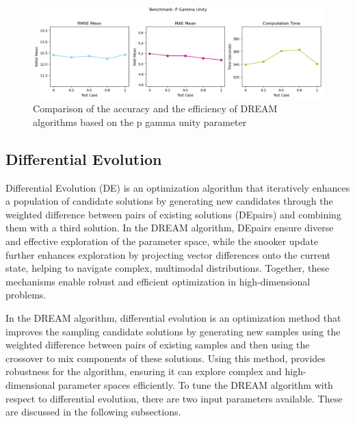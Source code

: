 \begin{figure}[H]
    \centering
    \includegraphics[width=1\textwidth]{figures/dream/gamma.png}
    \captionsetup{width=.8\textwidth}
    \caption{Comparison of the accuracy and the efficiency of DREAM algorithms based on the p gamma unity parameter}
    \label{fig:enter-label}
\end{figure}

\subsection{Differential Evolution}
Differential Evolution (DE) is an optimization algorithm that iteratively enhances a population of candidate solutions by generating new candidates through the weighted difference between pairs of existing solutions (DEpairs) and combining them with a third solution. In the DREAM algorithm, DEpairs ensure diverse and effective exploration of the parameter space, while the snooker update further enhances exploration by projecting vector differences onto the current state, helping to navigate complex, multimodal distributions. Together, these mechanisms enable robust and efficient optimization in high-dimensional problems.

In the DREAM algorithm, differential evolution is an optimization method that improves the sampling candidate solutions by generating new samples using the weighted difference between pairs of existing samples and then using the crossover to mix components of these solutions. Using this method, provides robustness for the algorithm, ensuring it can explore complex and high-dimensional parameter spaces efficiently. To tune the DREAM algorithm with respect to differential evolution, there are two input parameters available. These are discussed in the following subsections.

